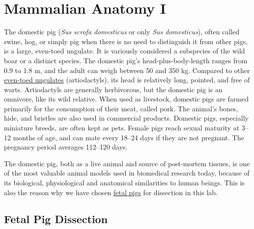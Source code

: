 \chapter{Mammalian Anatomy I}\label{mammalian-anatomy-i}

The domestic pig (\emph{Sus scrofa domesticus} or only \emph{Sus
domesticus}), often called swine, hog, or simply pig when there is no
need to distinguish it from other pigs, is a large, even-toed ungulate.
It is variously considered a subspecies of the wild boar or a distinct
species. The domestic pig's head-plus-body-length ranges from 0.9 to 1.8
m, and the adult can weigh between 50 and 350 kg. Compared to other
\href{https://en.wikipedia.org/wiki/Even-toed_ungulate}{even-toed
ungulates} (artiodactyls), its head is relatively long, pointed, and
free of warts. Artiodactyls are generally herbivorous, but the domestic
pig is an omnivore, like its wild relative. When used as livestock,
domestic pigs are farmed primarily for the consumption of their meat,
called pork. The animal's bones, hide, and bristles are also used in
commercial products. Domestic pigs, especially miniature breeds, are
often kept as pets. Female pigs reach sexual maturity at 3--12 months of
age, and can mate every 18--24 days if they are not pregnant. The
pregnancy period averages 112--120 days.

The domestic pig, both as a live animal and source of post-mortem
tissues, is one of the most valuable animal models used in biomedical
research today, because of its biological, physiological and anatomical
similarities to human beings. This is also the reason why we have chosen
\href{https://en.wikipedia.org/wiki/Fetal_pig}{fetal pigs} for
dissection in this lab.

\section{Fetal Pig Dissection}\label{fetal-pig-dissection}

